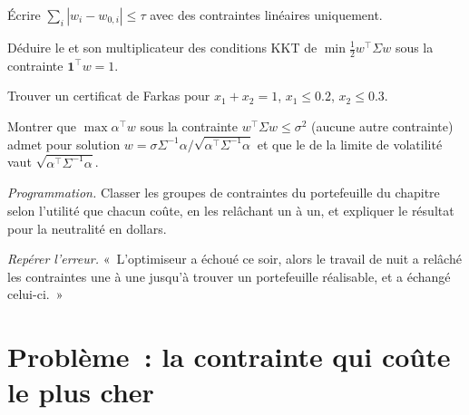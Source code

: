 \begin{exercise}[$\star$]\label{exo:qm:convex-optimisation:3}
Écrire $\sum_i|w_i - w_{0,i}| \le \tau$ avec des contraintes linéaires uniquement.
\end{exercise}

\begin{exercise}[$\star\star$]\label{exo:qm:convex-optimisation:4}
Déduire le  et son multiplicateur des conditions KKT de $\min\frac12w^\top\Sigma w$ sous la contrainte $\mathbf 1^\top w = 1$.
\end{exercise}

\begin{exercise}[$\star\star$]\label{exo:qm:convex-optimisation:5}
Trouver un certificat de Farkas pour $x_1 + x_2 = 1$, $x_1 \le 0.2$, $x_2 \le 0.3$.
\end{exercise}

\begin{exercise}[$\star\star$]\label{exo:qm:convex-optimisation:6}
Montrer que $\max\alpha^\top w$ sous la contrainte $w^\top\Sigma w \le \sigma^2$ (aucune autre contrainte) admet pour solution $w = \sigma\Sigma^{-1}\alpha/\sqrt{\alpha^\top\Sigma^{-1}\alpha}$ et que le  de la
limite de volatilité vaut $\sqrt{\alpha^\top\Sigma^{-1}\alpha}$.
\end{exercise}

\begin{exercise}[$\star\star\star$]\label{exo:qm:convex-optimisation:7}
\emph{Programmation.} Classer les groupes de contraintes du portefeuille du chapitre selon l'utilité que chacun coûte, en les relâchant un à un, et expliquer le résultat pour la neutralité en dollars.
\end{exercise}

\begin{exercise}[$\star\star\star$]\label{exo:qm:convex-optimisation:8}
\emph{Repérer l'erreur.} «~L'optimiseur a échoué ce soir, alors le travail de nuit a relâché les contraintes une à une jusqu'à trouver un portefeuille réalisable, et a échangé celui-ci.~»
\end{exercise}

\section{Problème~: la contrainte qui coûte le plus cher}

